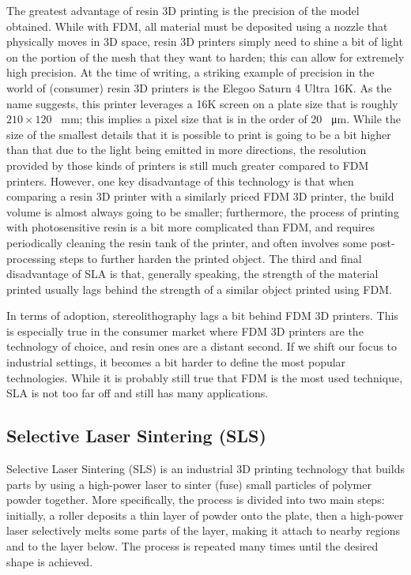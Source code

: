 The greatest advantage of resin 3D printing is the precision of the model obtained. While with FDM, all material must be
deposited using a nozzle that physically moves in 3D space, resin 3D printers simply need to shine a bit of light on the portion
of the mesh that they want to harden; this can allow for extremely high precision.
At the time of writing, a striking example of precision in the world of (consumer) resin 3D printers is the Elegoo Saturn 4 Ultra 16K.
As the name suggests, this printer leverages a 16K screen on a plate size that is roughly $210 \times 120$ \SI{}{\milli\metre}; this implies a pixel size that is in
the order of 20 \SI{}{\micro\metre}. While the size of the smallest details that it is possible to print is going to be a bit higher than that
due to the light being emitted in more directions, the resolution provided by those kinds of printers is still much greater compared
to FDM printers.
However, one key disadvantage of this technology is that when comparing a resin 3D printer with a similarly priced FDM 3D printer,
the build volume is almost always going to be smaller; furthermore, the process of printing with photosensitive resin is
a bit more complicated than FDM, and requires periodically cleaning the resin tank of the printer, and often involves some post-processing
steps to further harden the printed object.
The third and final disadvantage of SLA is that, generally speaking, the strength of the material printed usually lags behind
the strength of a similar object printed using FDM.

In terms of adoption, stereolithography lags a bit behind FDM 3D printers. This is especially true in the consumer
market where FDM 3D printers are the technology of choice, and resin ones are a distant second.
If we shift our focus to industrial settings, it becomes a bit harder to define the most popular technologies.
While it is probably still true that FDM is the most used technique, SLA is not too far off and still has many
applications.


\subsection{Selective Laser Sintering (SLS)}

Selective Laser Sintering (SLS) is an industrial 3D printing technology that builds parts by using a high-power
laser to sinter (fuse) small particles of polymer powder together.
More specifically, the process is divided into two main steps: initially, a roller deposits a thin layer of powder onto the plate,
then a high-power laser selectively melts some parts of the layer, making it attach to nearby regions and to the layer below.
The process is repeated many times until the desired shape is achieved.


